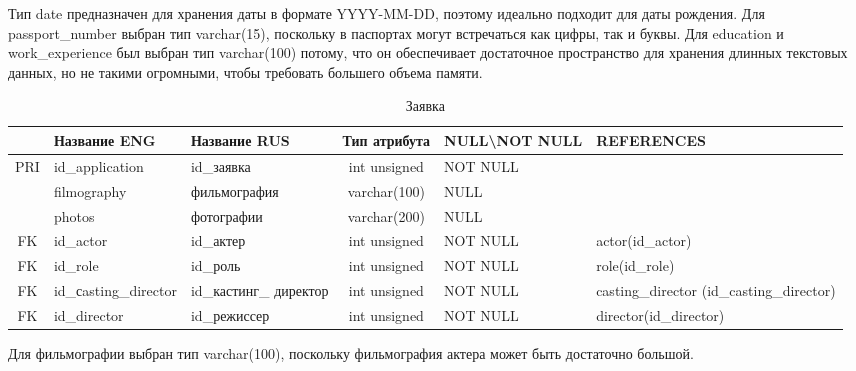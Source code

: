 \documentclass[11pt,a4paper,final]{article} %
\begin{document}
\par Тип date предназначен для хранения даты в формате YYYY-MM-DD, поэтому идеально подходит для даты рождения. Для passport\_number выбран тип varchar(15), поскольку в паспортах могут встречаться как цифры, так и буквы. Для education и work\_experience был выбран тип varchar(100) потому, что он обеспечивает достаточное пространство для хранения длинных текстовых данных, но не такими огромными, чтобы требовать большего объема памяти. 

\begin{table}[H]
	\centering
	\begin{tabular}{|c|p{2.8cm}|p{2.5cm}|c|p{2cm}|p{3.5cm}|}
		\hline
		& Название ENG & Название RUS & Тип атрибута & NULL\textbackslash \newline NOT NULL & REFERENCES \\
		\hline
		PRI & id\_application & id\_заявка & int unsigned & NOT NULL &  \\
		\hline
		& filmography & фильмография & varchar(100) & NULL & \\
		\hline
		& photos & фотографии & varchar(200) & NULL &  \\
		\hline
		FK & id\_actor & id\_актер & int unsigned & NOT NULL & actor(id\_actor) \\
		\hline
		FK & id\_role & id\_роль & int unsigned & NOT NULL & role(id\_role) \\
		\hline
		FK & id\_сasting\_\newline director & id\_кастинг\_ \newline директор & int unsigned & NOT NULL & casting\_director (id\_casting\_director) \\
		\hline
		FK & id\_director & id\_режиссер & int unsigned & NOT NULL & director(id\_director) \\
		\hline
	\end{tabular}
	\caption{Заявка}
    \label{tab:application}
\end{table}

\par Для фильмографии выбран тип varchar(100), поскольку фильмография актера может быть достаточно большой.
\end{document}

